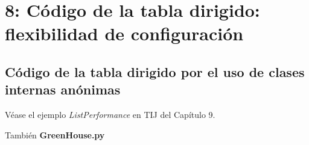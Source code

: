 \section*{\texorpdfstring{8: Código de la tabla dirigido: \newline flexibilidad de configuración}{8: Código Tabla impulsada: flexibilidad de configuración}}
\label{sec:ctifdc}



\subsection*{Código de la tabla dirigido por el uso de clases internas anónimas}
\label{subsec:cdltdpeudcia}

Véase  el ejemplo \textit{ListPerformance} en TIJ del Capítulo 9.   \newline

También \textbf{GreenHouse.py}

\newpage
